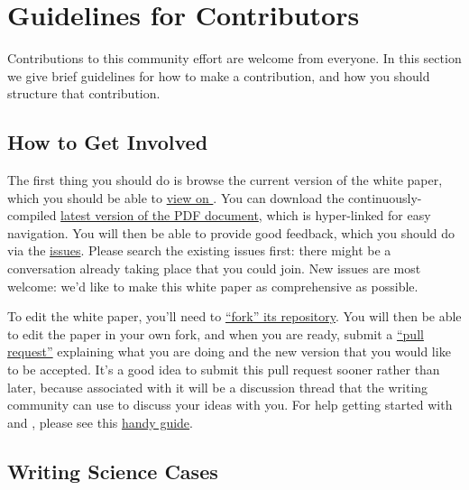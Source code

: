 \navigationbar



\section{Guidelines for Contributors}
\def\secname{guidelines}\label{sec:\secname}


Contributions to this community effort are welcome from everyone. In
this section we give brief guidelines for how to make a contribution,
and how you should structure that contribution.

\subsection{How to Get Involved}

The first thing you should do is browse the current version of the white
paper, which you should be able to \href{http://ls.st/iw2}{view on
\GitHub}. You can download the  continuously-compiled
\href{http://www.slac.stanford.edu/~digel/ObservingStrategy/whitepaper/LSST_Observing_Strategy_White_Paper.pdf}{latest
version of the PDF document}, which is hyper-linked for easy navigation.
You will then be able to provide good feedback, which you should do via
the
\href{https://github.com/LSSTScienceCollaborations/ObservingStrategy/issues}{\GitHub
issues}. Please search the existing issues first: there might be a
conversation already taking place that you could join. New issues are
most welcome: we'd like to make this white paper as comprehensive as
possible.

To edit the white paper, you'll need to
\href{https://help.github.com/articles/fork-a-repo/}{``fork'' its
repository}. You will then  be able to edit the paper in your own
fork, and when you are ready,  submit a
\href{https://help.github.com/articles/using-pull-requests/}{``pull
request''} explaining what you are doing and the new version that  you
would like to be accepted. It's a good idea to submit this pull
request sooner rather than later, because associated with it will be a
discussion thread that the writing community can use to discuss your
ideas with you. For help getting started with \git and \GitHub, please
see this
\href{https://github.com/drphilmarshall/GettingStarted#top}{handy
guide}.


\subsection{Writing Science Cases}

